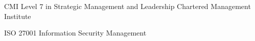
\begin{cventries}

  \cventry
    {CMI Level 7 in Strategic Management and Leadership} %
    {Chartered Management Institute} %
    {} %
    {} %
    {
    }

  \cventry
    {ISO 27001 Information Security Management} %
    {} %
    {} %
    {} %
    {
    }

\end{cventries}
